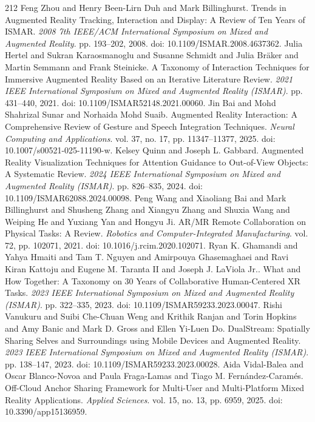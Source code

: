 \begin{thebibliography}{212}
 Feng Zhou and Henry Been-Lirn Duh and Mark Billinghurst. Trends in Augmented Reality Tracking, Interaction and Display: A Review of Ten Years of {ISMAR}. \emph{2008 7th IEEE/ACM International Symposium on Mixed and Augmented Reality}. pp. 193--202, 2008. doi: 10.1109/ISMAR.2008.4637362.
 Julia Hertel and Sukran Karaosmanoglu and Susanne Schmidt and Julia Br{\"a}ker and Martin Semmann and Frank Steinicke. A Taxonomy of Interaction Techniques for Immersive Augmented Reality Based on an Iterative Literature Review. \emph{2021 IEEE International Symposium on Mixed and Augmented Reality (ISMAR)}. pp. 431--440, 2021. doi: 10.1109/ISMAR52148.2021.00060.
 Jin Bai and Mohd Shahrizal Sunar and Norhaida Mohd Suaib. Augmented Reality Interaction: A Comprehensive Review of Gesture and Speech Integration Techniques. \emph{Neural Computing and Applications}. vol. 37, no. 17, pp. 11347--11377, 2025. doi: 10.1007/s00521-025-11190-w.
 Kelsey Quinn and Joseph L. Gabbard. Augmented Reality Visualization Techniques for Attention Guidance to Out-of-View Objects: A Systematic Review. \emph{2024 IEEE International Symposium on Mixed and Augmented Reality (ISMAR)}. pp. 826--835, 2024. doi: 10.1109/ISMAR62088.2024.00098.
 Peng Wang and Xiaoliang Bai and Mark Billinghurst and Shusheng Zhang and Xiangyu Zhang and Shuxia Wang and Weiping He and Yuxiang Yan and Hongyu Ji. {AR/MR} Remote Collaboration on Physical Tasks: A Review. \emph{Robotics and Computer-Integrated Manufacturing}. vol. 72, pp. 102071, 2021. doi: 10.1016/j.rcim.2020.102071.
 Ryan K. Ghamandi and Yahya Hmaiti and Tam T. Nguyen and Amirpouya Ghasemaghaei and Ravi Kiran Kattoju and Eugene M. Taranta II and Joseph J. LaViola Jr.. What and How Together: A Taxonomy on 30 Years of Collaborative Human-Centered {XR} Tasks. \emph{2023 IEEE International Symposium on Mixed and Augmented Reality (ISMAR)}. pp. 322--335, 2023. doi: 10.1109/ISMAR59233.2023.00047.
 Rishi Vanukuru and Suibi Che-Chuan Weng and Krithik Ranjan and Torin Hopkins and Amy Banic and Mark D. Gross and Ellen Yi-Luen Do. DualStream: Spatially Sharing Selves and Surroundings using Mobile Devices and Augmented Reality. \emph{2023 IEEE International Symposium on Mixed and Augmented Reality (ISMAR)}. pp. 138--147, 2023. doi: 10.1109/ISMAR59233.2023.00028.
 Aida Vidal-Balea and Oscar Blanco-Novoa and Paula Fraga-Lamas and Tiago M. Fern{\'a}ndez-Caram{\'e}s. Off-Cloud Anchor Sharing Framework for Multi-User and Multi-Platform Mixed Reality Applications. \emph{Applied Sciences}. vol. 15, no. 13, pp. 6959, 2025. doi: 10.3390/app15136959.

\end{thebibliography}
